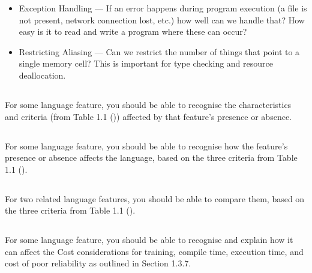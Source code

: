 \begin{itemize}
\begin{itemize}
  \item Exception Handling --- If an error happens during program execution (a file is not present, network connection lost, etc.) how well can we handle that? How easy is it to read and write a program where these can occur?
  \item Restricting Aliasing --- Can we restrict the number of things that point to a single memory cell? This is important for type checking and resource deallocation.
  \end{itemize}
\end{itemize}

\subsection{}
For some language feature, you should be able to recognise the characteristics and criteria (from Table 1.1 ()) affected by that feature's presence or absence.

\subsection{}
For some language feature, you should be able to recognise how the feature's presence or absence affects the language, based on the three criteria from Table 1.1 ().

\subsection{}
For two related language features, you should be able to compare them, based on the three criteria from Table 1.1 ().

\subsection{}
For some language feature, you should be able to recognise and explain how it can affect the Cost considerations for training, compile time, execution time, and cost of poor reliability as outlined in Section 1.3.7.

